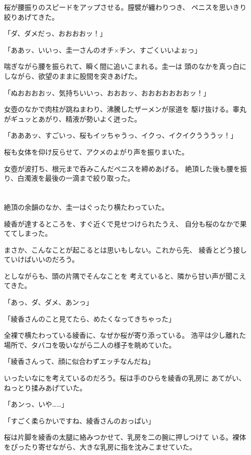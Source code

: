 ﻿\documentclass[
    book,tate,
    line_length=30zw,
    jafontsize=12pt,
    paper=b5j,
    landscape,
    ]{jlreq}
\begin{document}
桜が腰振りのスピードをアップさせる。膣襞が纏わりつき、
ペニスを思いきり絞りあげてきた。

「ダ、ダメだっ、おおおおッ！」

「ああッ、いいっ、圭一さんのオチ×チン、すごくいいよぉっ」

喘ぎながら腰を振られて、瞬く間に追いこまれる。圭一は
頭のなかを真っ白にしながら、欲望のままに股間を突きあげた。

「ぬおおおおッ、気持ちいいっ、おおおッ、おおおおおおおッ！」

女壺のなかで肉柱が跳ねまわり、沸騰したザーメンが尿道を
駆け抜ける。睾丸がギュッとあがり、精液が勢いよく迸った。

「あああッ、すごいっ、桜もイッちゃうっ、イクっ、イクイクうううッ！」

桜も女体を仰け反らせて、アクメのよがり声を振りまいた。

女壺が波打ち、根元まで呑みこんだペニスを締めあげる。
絶頂した後も腰を振り、白濁液を最後の一滴まで絞り取った。

\section*{}

絶頂の余韻のなか、圭一はぐったり横たわっていた。

綾香が達するところを、すぐ近くで見せつけられたうえ、
自分も桜のなかで果ててしまった。

まさか、こんなことが起こるとは思いもしない。これから先、
綾香とどう接していけばいいのだろう。

としながらも、頭の片隅でそんなことを
考えていると、隣から甘い声が聞こえてきた。

「あっ、ダ、ダメ、あンっ」

「綾香さんのこと見てたら、めたくなってきちゃった」

全裸で横たわっている綾香に、なぜか桜が寄り添っている。
浩平は少し離れた場所で、タバコを吸いながら二人の様子を眺めていた。

「綾香さんって、顔に似合わずエッチなんだね」

いったいなにを考えているのだろう。桜は手のひらを綾香の乳房に
あてがい、ねっとり揉みあげていた。

「あンっ、いや……」

「すごく柔らかいですね、綾香さんのおっぱい」

桜は片脚を綾香の太腿に絡みつかせて、乳房を二の腕に押しつけて
いる。裸体をぴったり寄せながら、大きな乳房に指を沈みこませていた。
\end{document}
